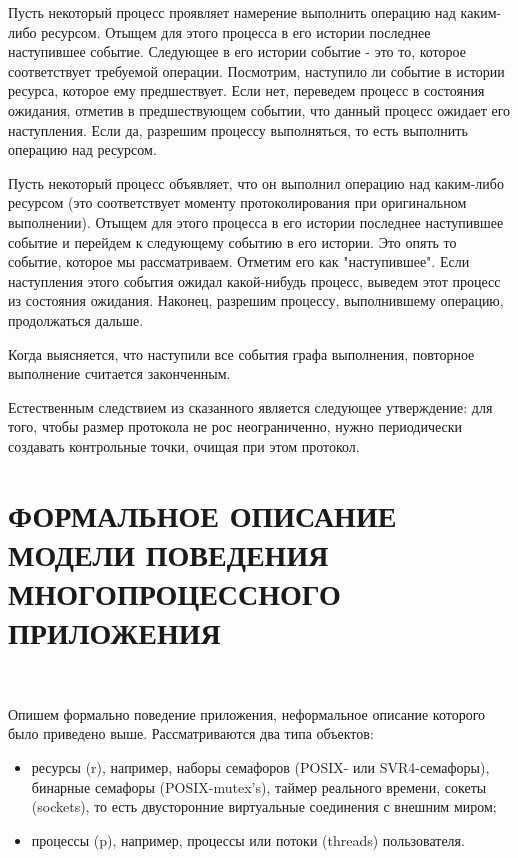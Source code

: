 \begin{multicols}{2}
Пусть некоторый процесс проявляет намерение выполнить операцию над каким-либо ресурсом. Отыщем для этого процесса в его истории последнее наступившее событие. Следующее в его истории событие - это то, которое соответствует требуемой операции. Посмотрим, наступило ли событие в истории ресурса, которое ему предшествует. Если нет, переведем процесс в состояния ожидания, отметив в предшествующем событии, что данный процесс ожидает его наступления. Если да, разрешим процессу выполняться, то есть выполнить операцию над ресурсом.

Пусть некоторый процесс объявляет, что он выполнил операцию над каким-либо ресурсом (это соответствует моменту протоколирования при оригинальном выполнении). Отыщем для этого процесса в его истории последнее наступившее событие и перейдем к следующему событию в его истории. Это опять то событие, которое мы рассматриваем. Отметим его как "наступившее". Если наступления этого события ожидал какой-нибудь процесс, выведем этот процесс из состояния ожидания. Наконец, разрешим процессу, выполнившему операцию, продолжаться дальше.

Когда выясняется, что наступили все события графа выполнения, повторное выполнение считается законченным.

Естественным следствием из сказанного является следующее утверждение: для того, чтобы размер протокола не рос неограниченно, нужно периодически создавать контрольные точки, очищая при этом протокол.

\section{ФОРМАЛЬНОЕ ОПИСАНИЕ МОДЕЛИ ПОВЕДЕНИЯ МНОГОПРОЦЕССНОГО ПРИЛОЖЕНИЯ}
\begin{figure*} %
\vspace*{1pt}
\begin{center}
\mbox{%
\epsfxsize=1.6in
\epsfxsize=100mm
}
\end{center}
\vspace*{-9pt}
\vspace*{-3pt}
\end{figure*}

Опишем формально поведение приложения, неформальное описание которого было приведено выше. Рассматриваются два типа объектов:
\begin{itemize}
\item ресурсы (r), например, наборы семафоров (POSIX- или SVR4-семафоры), бинарные семафоры (POSIX-mutex's), таймер реального времени, сокеты (sockets), то есть двусторонние виртуальные соединения с внешним миром;
\item процессы (p), например, процессы или потоки (threads) пользователя.
\end{itemize}

\end{multicols}

\label{end\stat}